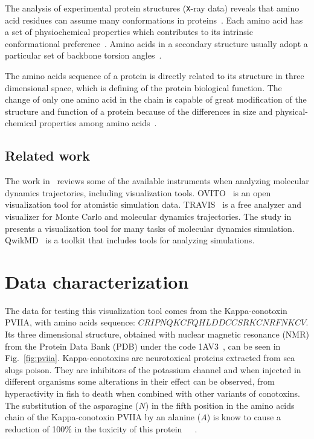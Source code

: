 \documentclass[10pt, conference]{IEEEtran}
\begin{document}
The analysis of experimental protein structures (\texttt{X}-ray data) reveals that amino acid residues can assume many conformations in proteins~\cite{Borguesan:2015}. Each amino acid has a set of physiochemical properties which contributes to its intrinsic conformational preference~\cite{Mathura:2005}. Amino acids in a secondary structure usually adopt a particular set of backbone torsion angles~\cite{Borguesan:2015}.

The amino acids sequence of a protein is directly related to its structure in three dimensional space, which is defining of the protein biological function. The change of only one amino acid in the chain is capable of great modification of the structure and function of a protein because of the differences in size and physical-chemical properties among amino acids~\cite{nelson2008lehninger}.

\subsection{Related work}
%
The work in~\cite{likhachev2016available} reviews some of the available instruments when analyzing molecular dynamics trajectories, including visualization tools. OVITO~\cite{stukowski2009visualization} is an open visualization tool for atomistic simulation data. TRAVIS~\cite{brehm2012travis} is a free analyzer and visualizer for Monte Carlo and molecular dynamics trajectories. The study in~\cite{garg2010visualization} presents a visualization tool for many tasks of molecular dynamics simulation. QwikMD~\cite{ribeiro2016qwikmd} is a toolkit that includes tools for analyzing simulations.

\section{Data characterization}

The data for testing this visualization tool comes from the Kappa-conotoxin PVIIA, with amino acids sequence: $CRIPNQKCFQHLDDCCSRKCNRFNKCV$. Its three dimensional structure, obtained with nuclear magnetic resonance (NMR) from the Protein Data Bank (PDB) under the code 1AV3~\cite{scanlon1997solution}, can be seen in Fig.~\ref{fig:pviia}. Kappa-conotoxins are neurotoxical proteins extracted from sea slugs poison. They are inhibitors of the potassium channel and when injected in different organisms some alterations in their effect can be observed, from hyperactivity in fish to death when combined with other variants of conotoxins. The substitution of the asparagine ($N$) in the fifth position in the amino acids chain of the Kappa-conotoxin PVIIA by an alanine ($A$) is know to cause a reduction of 100\% in the toxicity of this protein~\cite{jacobsen2000single}~\cite{mir2016conotoxins}~\cite{akey2002inherited}.
\end{document}
